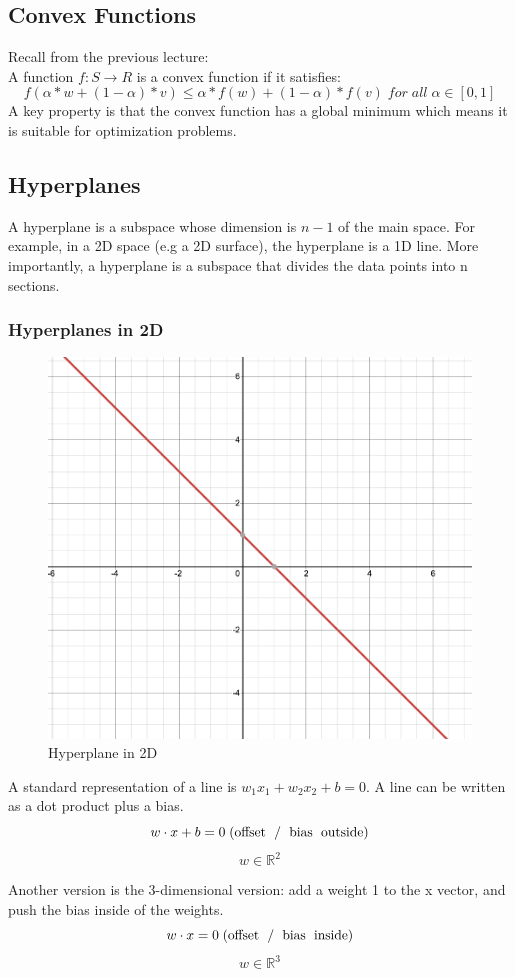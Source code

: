 \documentclass[11pt]{article}
\def\RR{\mathbb{R}}
\begin{document}
\subsection{Convex Functions}
Recall from the previous lecture: \\
A function $f:S \rightarrow R$ is a convex function if it satisfies:
$$f(\alpha*w + (1-\alpha)*v) \leq \alpha*f(w) +(1-\alpha)*f(v) \; for \; all \; \alpha \in [0,1] $$
A key property is that the convex function has a global minimum which means it is suitable for optimization problems. 

\subsection{Hyperplanes}
A hyperplane is a subspace whose dimension is $n-1$ of the main space. For example, in a 2D space (e.g a 2D surface), the hyperplane is a 1D line. More importantly, a hyperplane is a subspace that divides the data points into n sections. 



\subsubsection{Hyperplanes in 2D}
\begin{figure}[H]
  \centering
  \includegraphics[width=.2\linewidth]{images/hyperplane.png}
  \caption{Hyperplane in 2D}
  \label{fig:sfig2}
\end{figure}

A standard representation of a line is $w_1 x_1 + w_2 x_2 + b = 0$. A line can be written as a dot product plus a bias.
$$w \cdot x + b = 0 \; \text{(offset\; / \;bias\; outside)}$$
$$w \in \RR^2 $$

Another version is the 3-dimensional version: add a weight 1 to the x vector, and push the bias inside of the weights.
$$w \cdot x  = 0 \;\text{(offset\; / \;bias\; inside)}$$
$$w \in \RR^3 $$
\end{document}
